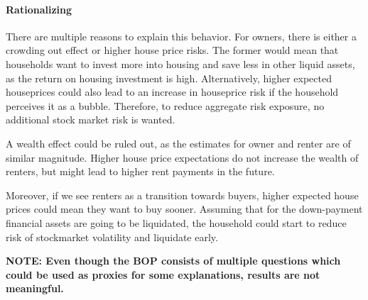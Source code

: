 \documentclass[ProjectABM]{subfiles}
\begin{document}






\paragraph{Rationalizing}
There are multiple reasons to explain this behavior. For owners, there is either a crowding out effect or higher house price risks. The former would mean that households want to invest more into housing and save less in other liquid assets, as the return on housing investment is high. Alternatively, higher expected houseprices could also lead to an increase in houseprice risk if the household perceives it as a bubble. Therefore, to reduce aggregate risk exposure, no additional stock market risk is wanted.

A wealth effect could be ruled out, as the estimates for owner and renter are of similar magnitude. Higher house price expectations do not increase the wealth of renters, but might lead to higher rent payments in the future. 

Moreover, if we see renters as a transition towards buyers, higher expected house prices could mean they want to buy sooner. Assuming that for the down-payment financial assets are going to be liquidated, the household could start to reduce risk of stockmarket volatility and liquidate early.

\textbf{NOTE: Even though the BOP consists of multiple questions which could be used as proxies for some explanations, results are not meaningful.}

\end{document}
